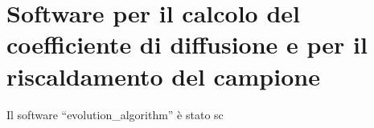 \documentclass[a4paper,11pt]{article}
\begin{document}
	\section{Software per il calcolo del coefficiente di diffusione e per il riscaldamento del campione} %
	\label{sec:software_per_il_calcolo_del_coefficiente_di_diffusione_e_per_il_riscaldamento_del_campione}
		Il software ``evolution_algorithm'' è stato sc
\end{document}
